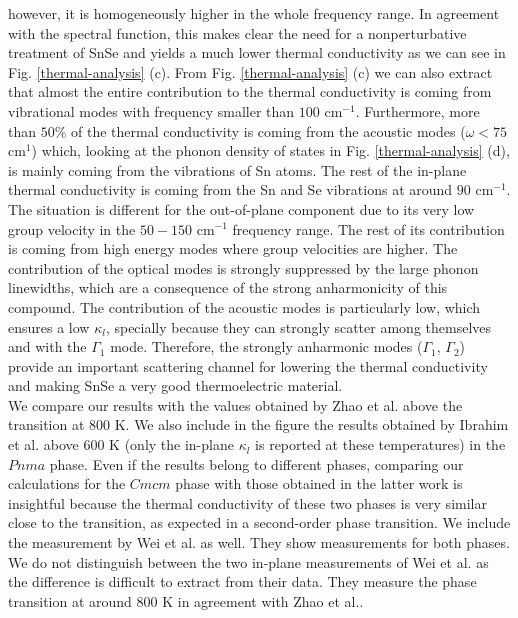 however, it is homogeneously higher in the whole frequency range. In agreement with the spectral function, this
makes clear the need for a nonperturbative treatment of SnSe and yields a much lower thermal conductivity as we can
see in Fig. \ref{thermal-analysis} (c). From Fig. \ref{thermal-analysis} (c) we can also extract that almost the 
entire contribution to the thermal conductivity is coming from vibrational modes with frequency smaller than $100$ 
cm$^{-1}$. Furthermore, more than $50\%$ of the thermal conductivity is coming from the acoustic modes
($\omega<75$ cm$^{1}$) which, looking at the phonon density of states in Fig. \ref{thermal-analysis} (d), is mainly
coming from the vibrations of Sn atoms. The rest of the in-plane thermal conductivity is coming from the Sn and Se
vibrations at around $90$ cm$^{-1}$. The situation is different for the out-of-plane component due to its very low
group velocity in the $50-150$ cm$^{-1}$ frequency range. The rest of its contribution is coming from high energy
modes where group velocities are higher. The contribution of the optical modes is strongly suppressed by the large
phonon linewidths, which are a consequence of the strong anharmonicity of this compound. The contribution of the
acoustic modes is particularly low, which ensures a low $\kappa_l$, specially because they can strongly scatter
among themselves and with the $\Gamma_1$ mode. Therefore, the strongly anharmonic modes ($\Gamma_{1}$, $\Gamma_{2}$)
provide an important scattering channel for lowering the thermal conductivity and making SnSe a very good
thermoelectric material. \\

We compare our results with the values obtained by Zhao et al.\cite{zhao2014ultralow} above the transition at $800$ K. We also include in the figure the results obtained by Ibrahim et al.\cite{ibrahim2017reinvestigation} above $600$ K (only the in-plane $\kappa_l$ is reported at these temperatures) in the $Pnma$ phase. Even if the results belong to different phases, comparing our calculations for the $Cmcm$ phase with those obtained in the latter work is insightful because the thermal conductivity of these two phases is very similar close to the transition, as expected in a second-order phase transition. We include the measurement by Wei et al.\cite{wei2019thermoelectric} as well. They show 
measurements for both phases. We do not distinguish between the two in-plane measurements of Wei et al. as the 
difference is difficult to extract from their data. They measure the phase transition at around $800$ K in agreement 
with Zhao et al.\cite{zhao2014ultralow}. \\

